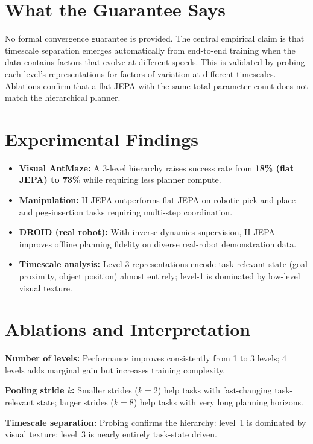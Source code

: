 \documentclass[10pt,twocolumn]{article}
\begin{document}
\section{What the Guarantee Says}

No formal convergence guarantee is provided. The central empirical claim is
that timescale separation emerges automatically from end-to-end training
when the data contains factors that evolve at different speeds. This is
validated by probing each level's representations for factors of variation
at different timescales. Ablations confirm that a flat JEPA with the same
total parameter count does not match the hierarchical planner.

\section{Experimental Findings}

\begin{itemize}[itemsep=2pt,parsep=0pt]
  \item \textbf{Visual AntMaze:} A 3-level hierarchy raises success rate from
    \textbf{18\% (flat JEPA) to 73\%} while requiring less planner compute.
  \item \textbf{Manipulation:} H-JEPA outperforms flat JEPA on robotic
    pick-and-place and peg-insertion tasks requiring multi-step coordination.
  \item \textbf{DROID (real robot):} With inverse-dynamics supervision,
    H-JEPA improves offline planning fidelity on diverse real-robot
    demonstration data.
  \item \textbf{Timescale analysis:} Level-3 representations encode
    task-relevant state (goal proximity, object position) almost entirely;
    level-1 is dominated by low-level visual texture.
\end{itemize}

\section{Ablations and Interpretation}

\textbf{Number of levels:} Performance improves consistently from 1 to 3
levels; 4 levels adds marginal gain but increases training complexity.

\textbf{Pooling stride $k$:} Smaller strides ($k{=}2$) help tasks with
fast-changing task-relevant state; larger strides ($k{=}8$) help tasks with
very long planning horizons.

\textbf{Timescale separation:} Probing confirms the hierarchy: level~1 is
dominated by visual texture; level~3 is nearly entirely task-state driven.
\end{document}
